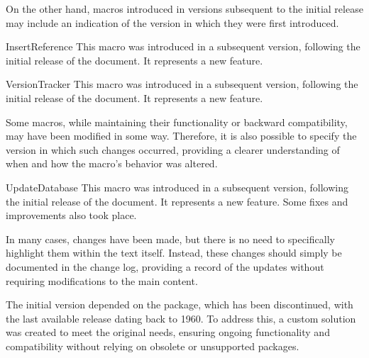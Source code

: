\documentclass[a4paper, 11pt]{article}
\begin{document}
On the other hand, macros introduced in versions subsequent to the initial release may include an indication of the version in which they were first introduced.

\begin{PDExample}
    \begin{Macro*}{InsertReference}{}{}
        This macro was introduced in a subsequent version, following the initial release of the document. It represents a new feature.
    \end{Macro*}

    \begin{Macro*}{VersionTracker}{}{}
        This macro was introduced in a subsequent version, following the initial release of the document. It represents a new feature.
    \end{Macro*}
\end{PDExample}

Some macros, while maintaining their functionality or backward compatibility, may have been modified in some way. Therefore, it is also possible to specify the version in which such changes occurred, providing a clearer understanding of when and how the macro's behavior was altered.

\begin{PDExample}
    \begin{Macro*}{UpdateDatabase}{}{}
        This macro was introduced in a subsequent version, following the initial release of the document. It represents a new feature. Some fixes and improvements also took place.
    \end{Macro*}
\end{PDExample}

In many cases, changes have been made, but there is no need to specifically highlight them within the text itself. Instead, these changes should simply be documented in the change log, providing a record of the updates without requiring modifications to the main content.

\begin{PDExample}
    The initial version depended on the  package, which has been discontinued, with the last available release dating back to 1960. To address this, a custom solution was created to meet the original needs, ensuring ongoing functionality and compatibility without relying on obsolete or unsupported packages.
\end{PDExample}
\end{document}
